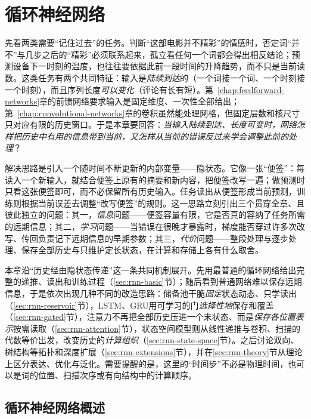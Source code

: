 \chapter{循环神经网络}
\label{chap:recurrent-networks}

先看两类需要“记住过去”的任务。判断“这部电影并不精彩”的情感时，否定词“并不”与几步之后的“精彩”必须联系起来，孤立看任何一个词都会得出相反结论；预测设备下一时刻的温度，也往往要依据此前一段时间的升降趋势，而不只是当前读数。这类任务有两个共同特征：输入是\emph{陆续到达}的（一个词接一个词、一个时刻接一个时刻），而且序列长度\emph{可以变化}（评论有长有短）。第~\ref{chap:feedforward-networks}章的前馈网络要求输入是固定维度、一次性全部给出；第~\ref{chap:convolutional-networks}章的卷积虽然能处理网格，但固定层数和核尺寸只对应有限的历史窗口。于是本章要回答：\emph{当输入陆续到达、长度可变时，网络怎样把历史中有用的信息带到当前，又怎样从当前的错误反过来学会调整此前的处理}？

解决思路是引入一个随时间不断更新的内部变量——隐状态。它像一张“便签”：每读入一个新输入，就结合便签上原有的摘要和新内容，把便签改写一遍；做预测时只看这张便签即可，而不必保留所有历史输入。任务读出从便签形成当前预测，训练则根据当前误差去调整“改写便签”的规则。这一思路立刻引出三个贯穿全章、且彼此独立的问题：其一，\emph{信息}问题——便签容量有限，它是否真的容纳了任务所需的远期信息；其二，\emph{学习}问题——当错误在很晚才暴露时，梯度能否穿过许多次改写、传回负责记下远期信息的早期参数；其三，\emph{代价}问题——整段处理与逐步处理、保存全部历史与只维护定长状态，在计算和存储上各有什么取舍。

本章沿“历史经由隐状态传递”这一条共同机制展开。先用最普通的循环网络给出完整的递推、读出和训练过程（\ref{sec:rnn-basic}节）；随后看到普通网络难以保存远期信息，于是依次出现几种不同的改造思路：储备池干脆\emph{固定}状态动态、只学读出（\ref{sec:rnn-reservoir}节），LSTM、GRU用可学习的门\emph{选择性地}保存和覆盖（\ref{sec:rnn-gated}节），注意力不再把全部历史压进一个末状态、而是\emph{保存各位置表示}按需读取（\ref{sec:rnn-attention}节），状态空间模型则从线性递推与卷积、扫描的代数等价出发，改变历史的\emph{计算组织}（\ref{sec:rnn-state-space}节）。之后讨论双向、树结构等拓扑和深度扩展（\ref{sec:rnn-extensions}节），并在\ref{sec:rnn-theory}节从理论上区分表达、优化与泛化。需要提醒的是，这里的“时间步”不必是物理时间，也可以是词的位置、扫描次序或有向结构中的计算顺序。

\FloatBarrier
\section{循环神经网络概述}
\label{sec:rnn-overview}

